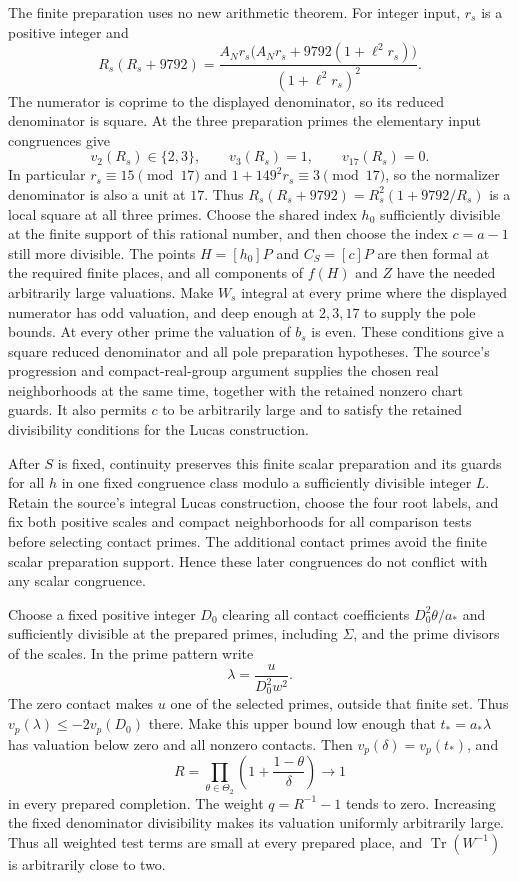 \documentclass[11pt,a4paper]{article}
\DeclareMathOperator{\Tr}{Tr}\DeclareMathOperator{\Nm}{Nm}
\begin{document}
The finite preparation uses no new arithmetic theorem. For integer
input, $r_s$ is a positive integer and
\[
 R_s(R_s+9792)=
 \frac{A_Nr_s\bigl(A_Nr_s+9792(1+\ell^2r_s)\bigr)}
                    {(1+\ell^2r_s)^2}.
\]
The numerator is coprime to the displayed denominator, so its reduced
denominator is square. At the three preparation primes the elementary
input congruences give
\[
 v_2(R_s)\in\{2,3\},\qquad v_3(R_s)=1,
                       \qquad v_{17}(R_s)=0.
\]
In particular $r_s\equiv15\pmod{17}$ and
$1+149^2r_s\equiv3\pmod{17}$, so the normalizer denominator is
also a unit at $17$. Thus
$R_s(R_s+9792)=R_s^2(1+9792/R_s)$ is a local square at all three primes.
Choose the shared index $h_0$ sufficiently divisible at the finite
support of this rational number, and then choose the index
$c=a-1$ still more divisible. The points $H=[h_0]P$ and $C_S=[c]P$
are then formal at the required finite places, and all components of
$f(H)$ and $Z$ have the needed arbitrarily large valuations. Make
$W_s$ integral at every prime where the displayed numerator has odd
valuation, and deep enough at $2,3,17$ to supply the pole bounds.
At every other prime the valuation of $b_s$ is even. These conditions
give a square reduced denominator and all pole preparation hypotheses.
The source's progression and compact-real-group argument supplies the
chosen real neighborhoods at the same time, together with the retained
nonzero chart guards. It also permits $c$ to be arbitrarily large and
to satisfy the retained divisibility conditions for the Lucas construction.

After $S$ is fixed, continuity preserves this finite scalar preparation
and its guards for all $h$ in one fixed congruence class modulo a
sufficiently divisible integer $L$. Retain the source's integral Lucas
construction, choose the four root labels, and fix both positive scales
and compact neighborhoods for all comparison tests before selecting
contact primes. The additional contact primes avoid the finite scalar
preparation support. Hence these later congruences do not conflict with
any scalar congruence.

Choose a fixed positive integer $D_0$ clearing all contact coefficients
$D_0^2\theta/a_*$ and sufficiently divisible at the prepared primes,
including $\Sigma$, and the prime divisors of the scales. In the prime
pattern write
\[
                         \lambda=\frac{u}{D_0^2w^2}.
\]
The zero contact makes $u$ one of the selected primes, outside that
finite set. Thus $v_p(\lambda)\le-2v_p(D_0)$ there. Make this upper
bound low enough that $t_*=a_*\lambda$ has valuation below zero and
all nonzero contacts. Then $v_p(\delta)=v_p(t_*)$, and
\begin{equation}\label{eq:preparedsquare}
 R=\prod_{\theta\in\Theta_2}
                 \left(1+\frac{1-\theta}{\delta}\right)
       \longrightarrow1
\end{equation}
in every prepared completion. The weight $q=R^{-1}-1$ tends to zero.
Increasing the fixed denominator divisibility makes its valuation
uniformly arbitrarily large. Thus all weighted test terms are small
at every prepared place, and $\Tr(W^{-1})$ is arbitrarily close to two.
\end{document}
